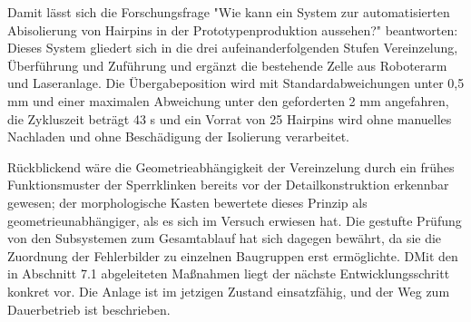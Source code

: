 Damit lässt sich die Forschungsfrage "Wie kann ein System zur automatisierten Abisolierung von Hairpins in der 
Prototypenproduktion aussehen?" beantworten:
Dieses System gliedert sich in die drei aufeinanderfolgenden Stufen Vereinzelung, Überführung und Zuführung 
und ergänzt die bestehende Zelle aus Roboterarm und Laseranlage. Die Übergabeposition wird mit Standardabweichungen 
unter 0,5 mm und einer maximalen Abweichung unter den geforderten 2 mm angefahren, die Zykluszeit beträgt 43 s 
und ein Vorrat von 25 Hairpins wird ohne manuelles Nachladen und ohne Beschädigung 
der Isolierung verarbeitet.

Rückblickend wäre die Geometrieabhängigkeit der Vereinzelung durch ein frühes Funktionsmuster der Sperrklinken 
bereits vor der Detailkonstruktion erkennbar gewesen; der morphologische Kasten bewertete dieses Prinzip als 
geometrieunabhängiger, als es sich im Versuch erwiesen hat. Die gestufte Prüfung von den Subsystemen zum Gesamtablauf 
hat sich dagegen bewährt, da sie die Zuordnung der Fehlerbilder zu einzelnen Baugruppen erst ermöglichte.
DMit den in Abschnitt 7.1 abgeleiteten Maßnahmen liegt der nächste Entwicklungsschritt konkret vor. Die Anlage 
ist im jetzigen Zustand einsatzfähig, und der Weg zum Dauerbetrieb ist beschrieben.
%
